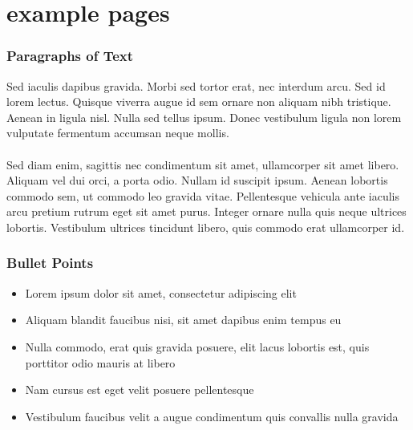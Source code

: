 \documentclass{beamer}
\begin{document}
\section{example pages}


\begin{frame}

\end{frame}
\begin{frame}

\end{frame}
\begin{frame}
\frametitle{Paragraphs of Text}
Sed iaculis dapibus gravida. Morbi sed tortor erat, nec interdum arcu. Sed id lorem lectus. Quisque viverra augue id sem ornare non aliquam nibh tristique. Aenean in ligula nisl. Nulla sed tellus ipsum. Donec vestibulum ligula non lorem vulputate fermentum accumsan neque mollis.\\~\\

Sed diam enim, sagittis nec condimentum sit amet, ullamcorper sit amet libero. Aliquam vel dui orci, a porta odio. Nullam id suscipit ipsum. Aenean lobortis commodo sem, ut commodo leo gravida vitae. Pellentesque vehicula ante iaculis arcu pretium rutrum eget sit amet purus. Integer ornare nulla quis neque ultrices lobortis. Vestibulum ultrices tincidunt libero, quis commodo erat ullamcorper id.
\end{frame}


\begin{frame}
\frametitle{Bullet Points}
\begin{itemize}
\item Lorem ipsum dolor sit amet, consectetur adipiscing elit
\item Aliquam blandit faucibus nisi, sit amet dapibus enim tempus eu
\item Nulla commodo, erat quis gravida posuere, elit lacus lobortis est, quis porttitor odio mauris at libero
\item Nam cursus est eget velit posuere pellentesque
\item Vestibulum faucibus velit a augue condimentum quis convallis nulla gravida
\end{itemize}
\end{frame}

\end{document}
